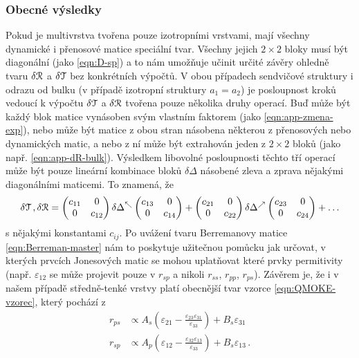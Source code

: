 \subsubsection*{Obecné výsledky}

Pokud je multivrstva tvořena pouze izotropními vrstvami, mají všechny dynamické i přenosové matice speciální tvar.
Všechny jejich $2\times2$ bloky musí být diagonální (jako \eqref{eqn:D-sp}) a to nám umožňuje učinit určité závěry ohledně tvaru $\delta\mathcal{R}$ a $\delta\mathcal{T}$ bez konkrétních výpočtů.
V obou případech sendvičové struktury i odrazu od bulku (v případě izotropní struktury $a_1=a_2$) je posloupnost kroků vedoucí k výpočtu $\delta\mathcal{T}$ a $\delta\mathcal{R}$ tvořena pouze několika druhy operací.
Buď může být každý blok matice vynásoben svým vlastním faktorem (jako \eqref{eqn:app-zmena-exp}), nebo může být matice z obou stran násobena některou z přenosových nebo dynamických matic, a nebo z ní může být extrahován jeden z $2\times2$ bloků (jako např. \eqref{eqn:app-dR-bulk}).
Výsledkem libovolné posloupnosti těchto tří operací může být pouze lineární kombinace bloků $\delta\Delta$ násobené zleva a zprava nějakými diagonálními maticemi.
To znamená, že
\begin{equation}
    \label{eqn:app-ktere-cleny}
    \begin{split}
        \delta\mathcal{T} \,, \delta\mathcal{R} = \begin{pmatrix} c_{11}&0\\0&c_{12} \end{pmatrix} \delta\Delta^\nwarrow \begin{pmatrix} c_{13}&0\\0&c_{14} \end{pmatrix} 
 +\begin{pmatrix} c_{21}&0\\0&c_{22} \end{pmatrix} \delta\Delta^\nearrow \begin{pmatrix} c_{23}&0\\0&c_{24} \end{pmatrix} + \ldots
\end{split}
\end{equation}
s nějakými konstantami $c_{ij}$.
Po uvážení tvaru Berremanovy matice \eqref{eqn:Berreman-master} nám to poskytuje užitečnou pomůcku jak určovat, v kterých prvcích Jonesových matic se mohou uplatňovat které prvky permitivity (např. $\varepsilon_{12}$ se může projevit pouze v $r_{sp}$ a nikoli $r_{ss}$, $r_{pp}$, $r_{ps}$).
Závěrem je, že i v našem případě středně-tenké vrstvy platí obecnější tvar vzorce \eqref{eqn:QMOKE-vzorec}, který pochází z \cite{hamrleVicinalInterfaceSensitive2003}
\begin{align}
    r_{ps} &\propto A_s \left( \varepsilon_{21} - \frac{\varepsilon_{23}\varepsilon_{31}}{\varepsilon_{33}}\right) + B_s \varepsilon_{31} \\
r_{sp} &\propto A_p \left( \varepsilon_{12} - \frac{\varepsilon_{32}\varepsilon_{13}}{\varepsilon_{33}}\right) + B_s \varepsilon_{13} \,.
\end{align}


